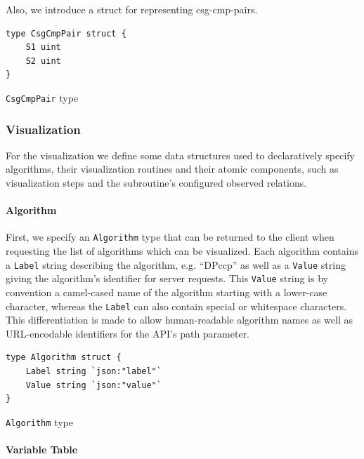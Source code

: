 Also, we introduce a struct for representing csg-cmp-pairs.
\begin{code}
\begin{verbatim}
type CsgCmpPair struct {
    S1 uint
    S2 uint
}
\end{verbatim}
\caption{\texttt{CsgCmpPair} type}
\label{datastructure:csg-cmp-pair}
\end{code}

\vspace{0.8cm}

\subsubsection{Visualization}

For the visualization we define some data structures used to declaratively specify algorithms, their visualization routines and their atomic components, such as visualization steps and the subroutine's configured observed relations. 

\paragraph{Algorithm}

First, we specify an \texttt{Algorithm} type that can be returned to the client when requesting the list of algorithms which can be visualized. Each algorithm contains a \texttt{Label} string describing the algorithm, e.g. ``DPccp'' as well as a \texttt{Value} string giving the algorithm's identifier for server requests. This \texttt{Value} string is by convention a camel-cased name of the algorithm starting with a lower-case character, whereas the \texttt{Label} can also contain special or whitespace characters. This differentiation is made to allow human-readable algorithm names as well as URL-encodable identifiers for the API's path parameter.

\newpage
\begin{code}
\begin{verbatim}   
type Algorithm struct {
    Label string `json:"label"`
    Value string `json:"value"`
}
\end{verbatim}
\caption{\texttt{Algorithm} type}
\end{code}
\vspace{0.8cm}

\paragraph{Variable Table}

